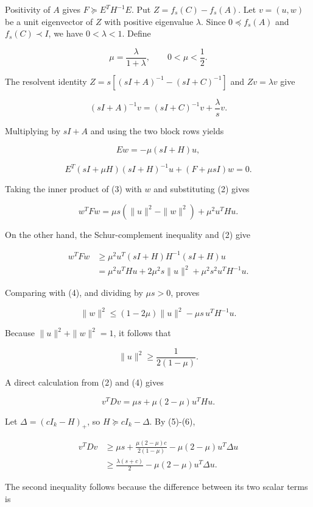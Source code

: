 \documentclass[10pt,a4paper]{article}
\begin{document}
Positivity of \(A\) gives \(F\succeq E^TH^{-1}E\). Put
\(Z=f_s(C)-f_s(A)\). Let \(v=(u,w)\) be a unit eigenvector of \(Z\) with
positive eigenvalue \(\lambda\). Since \(0\preceq f_s(A)\) and
\(f_s(C)\prec I\), we have \(0<\lambda<1\). Define

\[
\mu=\frac{\lambda}{1+\lambda},\qquad 0<\mu<\frac12.
\]

The resolvent identity \(Z=s[(sI+A)^{-1}-(sI+C)^{-1}]\) and
\(Zv=\lambda v\) give

\[
(sI+A)^{-1}v=(sI+C)^{-1}v+\frac\lambda s v.
\]

Multiplying by \(sI+A\) and using the two block rows yields

\[
Ew=-\mu(sI+H)u,\tag{2}
\]

\[
E^T(sI+\mu H)(sI+H)^{-1}u+(F+\mu sI)w=0.\tag{3}
\]

Taking the inner product of (3) with \(w\) and substituting (2) gives

\[
w^TFw=\mu s(\|u\|^2-\|w\|^2)+\mu^2u^THu.\tag{4}
\]

On the other hand, the Schur-complement inequality and (2) give

\[
\begin{aligned}
w^TFw
&\ge\mu^2u^T(sI+H)H^{-1}(sI+H)u\\
&=\mu^2u^THu+2\mu^2s\|u\|^2
  +\mu^2s^2u^TH^{-1}u.
\end{aligned}
\]

Comparing with (4), and dividing by \(\mu s>0\), proves

\[
\|w\|^2\le(1-2\mu)\|u\|^2-\mu s\,u^TH^{-1}u.
\]

Because \(\|u\|^2+\|w\|^2=1\), it follows that

\[
\|u\|^2\ge\frac1{2(1-\mu)}.\tag{5}
\]

A direct calculation from (2) and (4) gives

\[
v^TDv=\mu s+\mu(2-\mu)u^THu.\tag{6}
\]

Let \(\Delta=(cI_k-H)_+\), so \(H\succeq cI_k-\Delta\). By (5)-(6),

\[
\begin{aligned}
v^TDv
&\ge\mu s+\frac{\mu(2-\mu)c}{2(1-\mu)}
       -\mu(2-\mu)u^T\Delta u\\
&\ge\frac{\lambda(s+c)}2-\mu(2-\mu)u^T\Delta u.
\end{aligned}\tag{7}
\]


The second inequality follows because the difference between its two
scalar terms is
\end{document}
